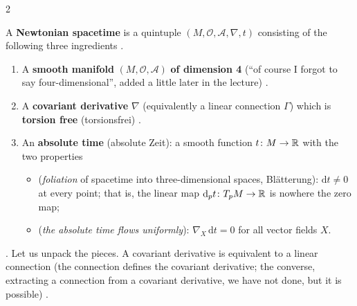 \begin{paracol}{2}
\begin{definition}\label{def:nk-spacetime}
A \textbf{Newtonian spacetime} is a quintuple $(M,\mathcal O,\mathcal A,\nabla,t)$ consisting of the following three ingredients
.
\begin{enumerate}
  \item A \textbf{smooth manifold} $(M,\mathcal O,\mathcal A)$ \textbf{of dimension 4} (``of course I forgot to say four-dimensional'', added
        a little later in the lecture) .
  \item A \textbf{covariant derivative} $\nabla$ (equivalently a linear connection $\Gamma$) which is \textbf{torsion free}
        (torsionsfrei) .
  \item An \textbf{absolute time} (absolute Zeit): a smooth function $t\colon M\to\mathbb{R}$ with the two properties
        \begin{itemize}
          \item[\textbf{Z1}] (\emph{foliation} of spacetime into three-dimensional spaces, Bl\"atterung): $\mathrm dt\ne0$ at every point; that is, the
                linear map $\mathrm d_pt\colon T_pM\to\mathbb{R}$ is nowhere the zero map;
          \item[\textbf{Z2}] (\emph{the absolute time flows uniformly}): $\nabla_X\,\mathrm dt=0$ for all vector fields $X$.
        \end{itemize}
\end{enumerate}
\end{definition}
.
Let us unpack the pieces. A covariant derivative is equivalent to a linear connection (the connection defines the covariant derivative; the converse,
extracting a connection from a covariant derivative, we have not done, but it is possible) .


\end{paracol}
